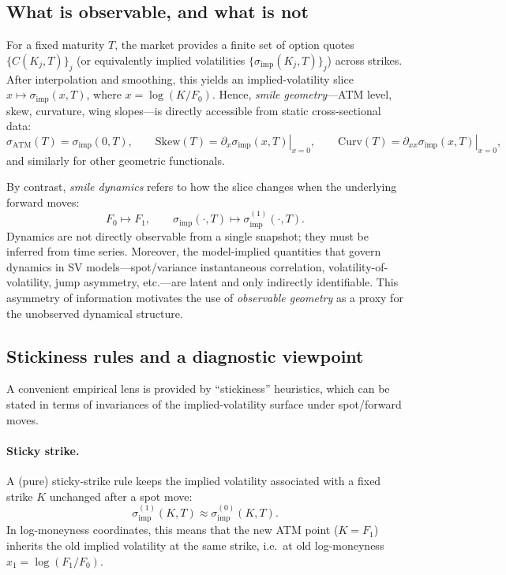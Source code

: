 \documentclass[11pt,a4paper]{report}
\begin{document}
\subsection{What is observable, and what is not}
For a fixed maturity $T$, the market provides a finite set of option quotes $\{C(K_j,T)\}_j$ (or equivalently implied volatilities $\{\sigma_{\mathrm{imp}}(K_j,T)\}_j$) across strikes.
After interpolation and smoothing, this yields an implied-volatility slice $x \mapsto \sigma_{\mathrm{imp}}(x,T)$, where $x=\log(K/F_0)$.
Hence, \emph{smile geometry}---ATM level, skew, curvature, wing slopes---is directly accessible from static cross-sectional data:
\begin{equation}
\sigma_{\mathrm{ATM}}(T)=\sigma_{\mathrm{imp}}(0,T),
\qquad
\mathrm{Skew}(T)=\left.\partial_x\sigma_{\mathrm{imp}}(x,T)\right|_{x=0},
\qquad
\mathrm{Curv}(T)=\left.\partial_{xx}\sigma_{\mathrm{imp}}(x,T)\right|_{x=0},
\end{equation}
and similarly for other geometric functionals.

By contrast, \emph{smile dynamics} refers to how the slice changes when the underlying forward moves:
\begin{equation}
F_0 \mapsto F_1,
\qquad
\sigma_{\mathrm{imp}}(\cdot,T)\mapsto \sigma_{\mathrm{imp}}^{(1)}(\cdot,T).
\end{equation}
Dynamics are not directly observable from a single snapshot; they must be inferred from time series.
Moreover, the model-implied quantities that govern dynamics in SV models---spot/variance instantaneous correlation, volatility-of-volatility, jump asymmetry, etc.---are latent and only indirectly identifiable.
This asymmetry of information motivates the use of \emph{observable geometry} as a proxy for the unobserved dynamical structure.

\subsection{Stickiness rules and a diagnostic viewpoint}
A convenient empirical lens is provided by ``stickiness'' heuristics, which can be stated in terms of invariances of the implied-volatility surface under spot/forward moves.

\paragraph{Sticky strike.}
A (pure) sticky-strike rule keeps the implied volatility associated with a fixed strike $K$ unchanged after a spot move:
\begin{equation}
\sigma_{\mathrm{imp}}^{(1)}(K,T) \approx \sigma_{\mathrm{imp}}^{(0)}(K,T).
\end{equation}
In log-moneyness coordinates, this means that the new ATM point ($K=F_1$) inherits the old implied volatility at the same strike, i.e.\ at old log-moneyness $x_1=\log(F_1/F_0)$.
\end{document}
